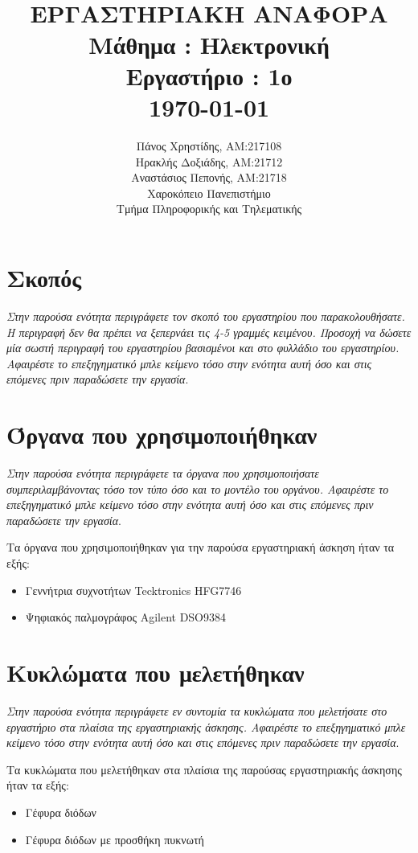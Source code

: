 \documentclass{article}
\title{ \normalsize \textsc{}
		\\ [2.0cm]
		\HRule{0.5pt} \\
		\LARGE \textbf{\uppercase{Eργαστηριακη Αναφορα} \\ [0.5cm]
		\Large Μάθημα : Ηλεκτρονική \\ [0.5cm]
		\large Εργαστήριο : 1ο
		\HRule{2pt} \\ [0.5cm]
		\normalsize \today \vspace*{5\baselineskip}}
		}
\date{}
\author{
		Πάνος Χρηστίδης, ΑΜ:217108 \\
		Ηρακλής Δοξιάδης, ΑΜ:21712 \\
		Αναστάσιος Πεπονής, ΑΜ:21718 \\ [0.5cm]
		Χαροκόπειο Πανεπιστήμιο \\
		Τμήμα Πληροφορικής και Τηλεματικής}
\begin{document}
\maketitle
\thispagestyle{empty}
\newpage

\section{Σκοπός}
\color{blue}
\textit{Στην παρούσα ενότητα περιγράφετε τον σκοπό του εργαστηρίου που παρακολουθήσατε. Η περιγραφή δεν θα πρέπει να ξεπερνάει τις 4-5 γραμμές κειμένου. Προσοχή να δώσετε μία σωστή περιγραφή του εργαστηρίου βασισμένοι και στο φυλλάδιο του εργαστηρίου. Αφαιρέστε το επεξηγηματικό μπλε κείμενο τόσο στην ενότητα αυτή όσο και στις επόμενες πριν παραδώσετε την εργασία}.
\color{black}

\section{Όργανα που χρησιμοποιήθηκαν}
\color{blue}
\textit{Στην παρούσα ενότητα περιγράφετε τα όργανα που χρησιμοποιήσατε συμπεριλαμβάνοντας τόσο τον τύπο όσο και το μοντέλο του οργάνου. Αφαιρέστε το επεξηγηματικό μπλε κείμενο τόσο στην ενότητα αυτή όσο και στις επόμενες πριν παραδώσετε την εργασία}.
\color{black}

Τα όργανα που χρησιμοποιήθηκαν για την παρούσα εργαστηριακή άσκηση ήταν τα εξής:
\begin{itemize}
\item Γεννήτρια συχνοτήτων Tecktronics HFG7746
\item Ψηφιακός παλμογράφος Αgilent DSO9384
\end{itemize}
\section{Κυκλώματα που μελετήθηκαν}
\label{sec:circuits}
\color{blue}
\textit{Στην παρούσα ενότητα περιγράφετε εν συντομία τα κυκλώματα που μελετήσατε στο εργαστήριο στα πλαίσια της εργαστηριακής άσκησης. Αφαιρέστε το επεξηγηματικό μπλε κείμενο τόσο στην ενότητα αυτή όσο και στις επόμενες πριν παραδώσετε την εργασία}.
\color{black}

Τα κυκλώματα που μελετήθηκαν στα πλαίσια της παρούσας εργαστηριακής άσκησης ήταν τα εξής:
\begin{itemize}
\item Γέφυρα διόδων
\item Γέφυρα διόδων με προσθήκη πυκνωτή
\end{itemize}
\end{document}
